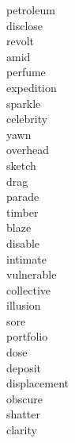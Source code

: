 \documentclass[a4paper, 10pt]{ctexart}
\begin{document}
\begin{multicols*}{2}
\begin{description}
\item[petroleum]

\item[disclose]

\item[revolt]

\item[amid]

\item[perfume]

\item[expedition]

\item[sparkle]

\item[celebrity]

\item[yawn]

\item[overhead]

\item[sketch]

\item[drag]

\item[parade]

\item[timber]

\item[blaze]

\item[disable]

\item[intimate]

\item[vulnerable]

\item[collective]

\item[illusion]

\item[sore]

\item[portfolio]

\item[dose]

\item[deposit]

\item[displacement]

\item[obscure]

\item[shatter]

\item[clarity]


\end{description}
\end{multicols*}
\end{document}

